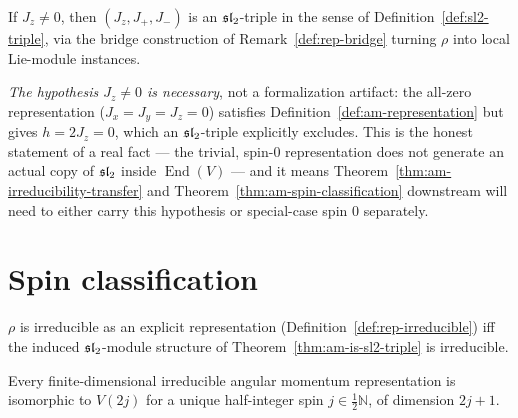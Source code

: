 \begin{theorem}
  \label{thm:am-is-sl2-triple}
  \leanok
  If $J_z \neq 0$, then $(J_z, J_+, J_-)$ is an $\mathfrak{sl}_2$-triple in the sense
  of Definition~\ref{def:sl2-triple}, via the bridge construction of
  Remark~\ref{def:rep-bridge} turning $\rho$ into local Lie-module instances.

  \emph{The hypothesis $J_z \neq 0$ is necessary}, not a formalization
  artifact: the all-zero representation ($J_x=J_y=J_z=0$) satisfies
  Definition~\ref{def:am-representation} but gives $h = 2J_z = 0$, which an
  $\mathfrak{sl}_2$-triple explicitly excludes. This is the honest statement of a real
  fact --- the trivial, spin-$0$ representation does not generate an actual
  copy of $\mathfrak{sl}_2$ inside $\operatorname{End}(V)$ --- and it means
  Theorem~\ref{thm:am-irreducibility-transfer} and
  Theorem~\ref{thm:am-spin-classification} downstream will need to either
  carry this hypothesis or special-case spin $0$ separately.
\end{theorem}

\section{Spin classification}
\label{sec:am-classification}

\begin{theorem}
  \label{thm:am-irreducibility-transfer}
  \leanok
  $\rho$ is irreducible as an explicit representation
  (Definition~\ref{def:rep-irreducible}) iff the induced $\mathfrak{sl}_2$-module
  structure of Theorem~\ref{thm:am-is-sl2-triple} is irreducible.
\end{theorem}

\begin{theorem}
  \label{thm:am-spin-classification}
  \leanok
  Every finite-dimensional irreducible angular momentum representation is
  isomorphic to $V(2j)$ for a unique half-integer spin
  $j \in \tfrac12\mathbb{N}$, of dimension $2j+1$.
\end{theorem}

